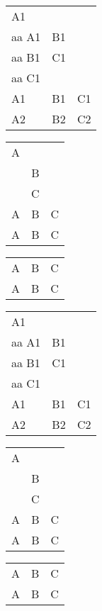 \documentclass[russian]{report}
\begin{document}
\begin{tabular}{|>{\centering}p{0.08\paperwidth}|>{\centering}b{0.08\paperwidth}|>{\centering}m{0.08\paperwidth}|}
\hline
A1 \\ aa A1 & B1 \\ aa B1 & C1 \\ aa C1 \tabularnewline
\hline
A1 & B1 & C1 \tabularnewline
\hline
A2 & B2 & C2 \tabularnewline
\hline
\end{tabular}

\begin{tabular}{|c|c|c|}
A \\ & B \\ & C \\
A & B & C \\
A & B & C
\end{tabular}
\begin{tabular}{|c|c|c|}
A & B & C \\
A & B & C \\
\end{tabular}

\begin{longtable}{|>{\centering}p{0.08\paperwidth}|>{\centering}b{0.08\paperwidth}|>{\centering}m{0.08\paperwidth}|}
\hline
A1 \\ aa A1 & B1 \\ aa B1 & C1 \\ aa C1 \tabularnewline
\hline
A1 & B1 & C1 \tabularnewline
\hline
A2 & B2 & C2 \tabularnewline
\hline
\end{longtable}

\begin{longtable}{|c|c|c|}
A \\ & B \\ & C \\
A & B & C \\
A & B & C
\end{longtable}
\begin{longtable}{|c|c|c|}
A & B & C \\
A & B & C \\
\end{longtable}
\end{document}
